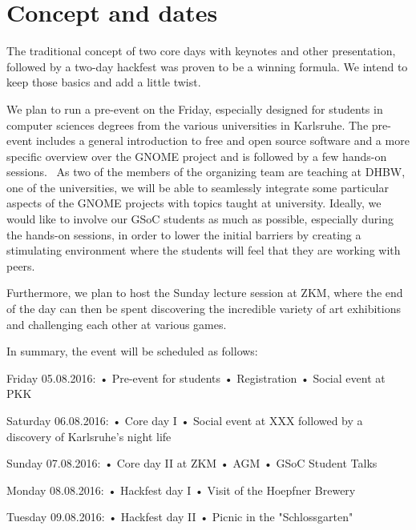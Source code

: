 
\section{Concept and dates}

The traditional concept of two core days with keynotes and other presentation, followed by a two-day hackfest was proven to be a winning formula. We intend to keep those basics and add a little twist. 

We plan to run a pre-event on the Friday, especially designed for students in computer sciences degrees from the various universities in Karlsruhe. The pre-event includes a general introduction to free and open source software and a more specific overview over the GNOME project and is followed by a few hands-on sessions.  As two of the members of the organizing team are teaching at DHBW, one of the universities, we will be able to seamlessly integrate some particular aspects of the GNOME projects with topics taught at university. Ideally, we would like to involve our GSoC students as much as possible, especially during the hands-on sessions, in order to lower the initial barriers by creating a stimulating environment where the students will feel that they are working with peers. 

Furthermore, we plan to host the Sunday lecture session at ZKM, where the end of the day can then be spent discovering the incredible variety of art exhibitions and challenging each other at various games.

In summary, the event will be scheduled as follows:

Friday 05.08.2016: 
• Pre-event for students
• Registration
• Social event at PKK 

Saturday 06.08.2016:
• Core day I
• Social event at XXX followed by a discovery of Karlsruhe's night life

Sunday 07.08.2016:
• Core day II at ZKM
• AGM
• GSoC Student Talks

Monday 08.08.2016:
• Hackfest day I
• Visit of the Hoepfner Brewery 

Tuesday 09.08.2016:
• Hackfest day II
• Picnic in the "Schlossgarten" 


